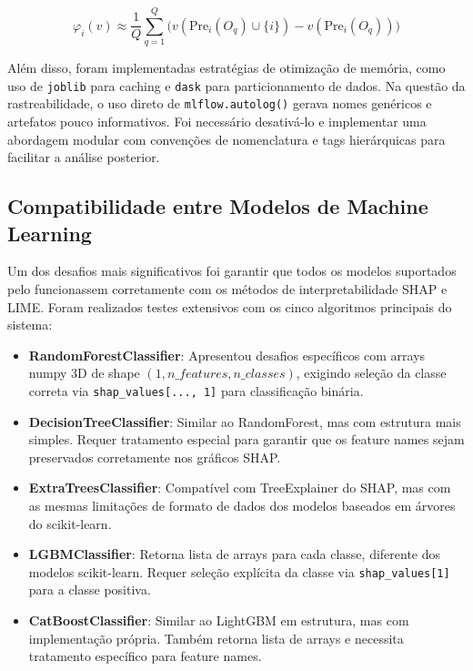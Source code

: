 \begin{equation}
    \varphi_i(v) \approx \frac{1}{Q}\sum_{q=1}^Q \big(v(\text{Pre}_i(O_q)\cup\{i\}) - v(\text{Pre}_i(O_q))\big)
\end{equation}

Além disso, foram implementadas estratégias de otimização de memória, como uso de \texttt{joblib} para caching e \texttt{dask} para particionamento de dados. Na questão da rastreabilidade, o uso direto de \texttt{mlflow.autolog()} gerava nomes genéricos e artefatos pouco informativos. Foi necessário desativá-lo e implementar uma abordagem modular com convenções de nomenclatura e tags hierárquicas para facilitar a análise posterior.

\subsection*{Compatibilidade entre Modelos de Machine Learning}

Um dos desafios mais significativos foi garantir que todos os modelos suportados pelo \toolname{} funcionassem corretamente com os métodos de interpretabilidade SHAP e LIME. Foram realizados testes extensivos com os cinco algoritmos principais do sistema:

\begin{itemize}
    \item \textbf{RandomForestClassifier}: Apresentou desafios específicos com arrays numpy 3D de shape $(1, n\_features, n\_classes)$, exigindo seleção da classe correta via \texttt{shap\_values[..., 1]} para classificação binária.
    
    \item \textbf{DecisionTreeClassifier}: Similar ao RandomForest, mas com estrutura mais simples. Requer tratamento especial para garantir que os feature names sejam preservados corretamente nos gráficos SHAP.
    
    \item \textbf{ExtraTreesClassifier}: Compatível com TreeExplainer do SHAP, mas com as mesmas limitações de formato de dados dos modelos baseados em árvores do scikit-learn.
    
    \item \textbf{LGBMClassifier}: Retorna lista de arrays para cada classe, diferente dos modelos scikit-learn. Requer seleção explícita da classe via \texttt{shap\_values[1]} para a classe positiva.
    
    \item \textbf{CatBoostClassifier}: Similar ao LightGBM em estrutura, mas com implementação própria. Também retorna lista de arrays e necessita tratamento específico para feature names.
\end{itemize}

